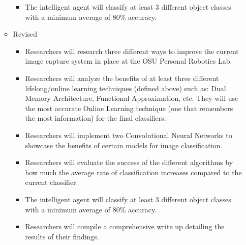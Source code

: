 \documentclass[draftclsnofoot, onecolumn, 10pt, compsoc]{IEEEtran}
\begin{document}
\begin{itemize}
\begin{itemize}
\begin{itemize}
						\item The intelligent agent will classify at least 3 different object classes with a minimum average of 80\% accuracy. 
					\end{itemize} 	
				
				\item Revised
					\begin{itemize}
						\item Researchers will research three different ways to improve the current image capture system in place at the OSU Personal Robotics Lab. 
						
						\item Researchers will analyze the benefits of at least three different lifelong/online learning techniques (defined above) such as: Dual Memory Architecture, Functional Approximation, etc. They will use the most accurate Online Learning technique (one that remembers the most information) for the final classifiers.
						
						\item Researchers will implement two Convolutional Neural Networks to showcase the benefits of certain models for image classification. 
						
						\item Researchers will evaluate the success of the different algorithms by how much the average rate of classification increases compared to the current classifier.
						
						\item The intelligent agent will classify at least 3 different object classes with a minimum average of 80\% accuracy. 
						
						\item Researchers will compile a comprehensive write up detailing the results of their findings. 
					\end{itemize}	
			\end{itemize}
	\end{itemize}
\end{document}
